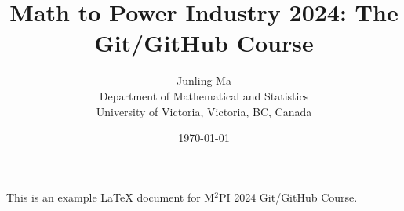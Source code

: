 \documentclass{article}
\title{Math to Power Industry 2024: The Git/GitHub Course}
\author{Junling Ma\\Department of Mathematical and Statistics\\
    University of Victoria, Victoria, BC, Canada}
\date{\today}
\begin{document}
    \maketitle

    This is an example LaTeX document for M$^2$PI 2024 Git/GitHub Course.
\end{document}
